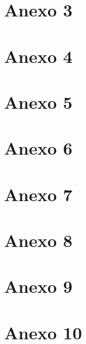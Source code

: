\documentclass[a4paper,12pt]{scrreprt}
\begin{document}
    \section{Anexo 3} \label{Modelação Física}
        
\newpage
    \section{Anexo 4} \label{Vistas de Utilização}
    \footnotesize
        
\newpage
    \section{Anexo 5} \label{Atualização de Tabelas}
    \footnotesize
        
\newpage
    \section{Anexo 6} \label{Tradução das Interrogações do Utilizador para SQL: Queries}
    \footnotesize
        
\newpage
    \section{Anexo 7} \label{Tradução das Interrogações do Utilizador para SQL: Funções e Procedimentos}
    \footnotesize
        
\newpage
    \section{Anexo 8} \label{Grant e Revoke}
    \footnotesize
        
\newpage
    \section{Anexo 9} \label{Povoamento Inicial}
    \footnotesize
        
\newpage
    \section{Anexo 10} \label{Eventos}
    \footnotesize
        
\end{document}
